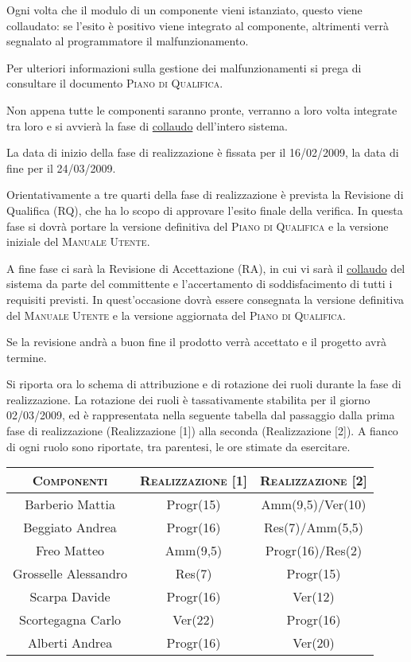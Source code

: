 \documentclass[11pt,a4paper]{article}
\begin{document}
Ogni volta che il modulo di un componente vieni istanziato, questo viene collaudato: se l'esito è positivo viene integrato al componente, altrimenti verrà segnalato al programmatore il malfunzionamento.

Per ulteriori informazioni sulla gestione dei malfunzionamenti si prega di consultare il documento \textsc{Piano di Qualifica}.

Non appena tutte le componenti saranno pronte, verranno a loro volta integrate tra loro e si avvierà la fase di \underline{collaudo} dell'intero sistema.

La data di inizio della fase di realizzazione è fissata per il 16/02/2009, la data di fine per il 24/03/2009.

Orientativamente a tre quarti della fase di realizzazione è prevista la Revisione di Qualifica (RQ), che ha lo scopo di approvare l'esito finale della verifica. In questa fase si dovrà portare la versione definitiva del \textsc{Piano di Qualifica} e la versione iniziale del \textsc{Manuale Utente}.

A fine fase ci sarà la Revisione di Accettazione (RA), in cui vi sarà il \underline{collaudo} del sistema da parte del committente e l'accertamento di soddisfacimento di tutti i requisiti previsti. In quest'occasione dovrà essere consegnata la versione definitiva del \textsc{Manuale Utente} e la versione aggiornata del \textsc{Piano di Qualifica}.

Se la revisione andrà a buon fine il prodotto verrà accettato e il progetto avrà termine.

Si riporta ora lo schema di attribuzione e di rotazione dei ruoli durante la fase di realizzazione.
La rotazione dei ruoli è tassativamente stabilita per il giorno 02/03/2009, ed è rappresentata nella seguente tabella dal passaggio dalla prima fase di realizzazione (Realizzazione [1]) alla seconda (Realizzazione [2]).
A fianco di ogni ruolo sono riportate, tra parentesi, le ore stimate da esercitare.
\\
\begin{center}
\begin{tabular}{|c||c|c|}
\hline
\textsc{Componenti} & \textsc{Realizzazione [1]} & \textsc{Realizzazione [2]} \\ \hline \hline
Barberio Mattia & Progr(15) & Amm(9,5)/Ver(10) \\ \hline
Beggiato Andrea & Progr(16) & Res(7)/Amm(5,5) \\ \hline
Freo Matteo & Amm(9,5) & Progr(16)/Res(2) \\ \hline
Grosselle Alessandro & Res(7) & Progr(15) \\ \hline
Scarpa Davide & Progr(16) & Ver(12) \\ \hline
Scortegagna Carlo & Ver(22) & Progr(16) \\ \hline
Alberti Andrea & Progr(16) & Ver(20) \\ \hline
\end{tabular}
\end{center}
\bigskip
\end{document}
